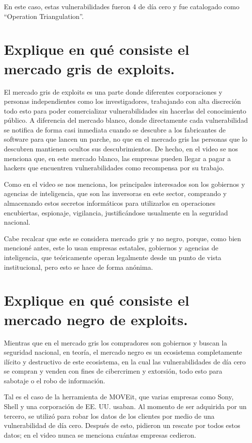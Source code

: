 \documentclass[letterpaper,11pt]{article}
\begin{document}
En este caso, estas vulnerabilidades fueron 4 de día cero y fue catalogado como ``Operation Triangulation''.

\section{Explique en qué consiste el mercado gris de exploits.}

El mercado gris de exploits 
es una parte donde diferentes corporaciones 
y personas independientes como los investigadores, 
trabajando con alta discreción 
todo esto para poder comercializar 
vulnerabilidades 
sin hacerlas del conocimiento público. 
A diferencia del mercado blanco, donde directamente 
cada vulnerabilidad se notifica de forma 
casi inmediata cuando se descubre 
a los fabricantes de 
software para que lancen un parche, 
no que en el mercado gris las personas que lo descubren mantienen ocultos
sus descubrimientos. De hecho, en el video se nos menciona que, en este mercado blanco, las empresas 
pueden llegar a pagar a hackers que encuentren vulnerabilidades como
recompensa por su trabajo.

Como en el video se nos menciona, 
los principales interesados son los gobiernos 
y agencias de inteligencia, que son las 
inversoras en este sector, 
comprando y almacenando estos 
secretos informáticos para utilizarlos 
en operaciones encubiertas, espionaje, 
vigilancia, 
justificándose usualmente en la seguridad nacional.

Cabe recalcar que este se considera mercado gris y no negro, porque, 
como bien mencioné antes, este lo usan empresas estatales, gobiernos y agencias de inteligencia, que teóricamente 
operan legalmente desde un punto de vista institucional, pero esto se hace de forma anónima.



\section{Explique en qué consiste el mercado negro de exploits. }

Mientras que en el mercado gris los compradores son gobiernos y buscan la seguridad nacional, en teoría, 
el mercado negro es un ecosistema completamente ilícito 
y destructivo de este ecosistema, 
en la cual las vulnerabilidades de día cero se compran 
y venden con fines de cibercrimen y extorsión, todo esto para sabotaje o el robo de información.

Tal es el caso de la herramienta de MOVEit, que varias empresas como Sony, Shell 
y una corporación de EE. UU. usaban. Al momento de ser 
adquirida por un tercero, se utilizó para robar los datos de los clientes 
por medio de una vulnerabilidad de día cero. Después de esto, 
pidieron un rescate por todos estos datos; en el video nunca se menciona cuántas
empresas cedieron.
\end{document}
